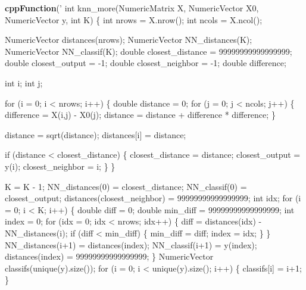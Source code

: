 \documentclass[]{article}
\newenvironment{Shaded}{\begin{snugshade}}{\end{snugshade}}
\newcommand{\KeywordTok}[1]{\textcolor[rgb]{0.13,0.29,0.53}{\textbf{#1}}}
\newcommand{\NormalTok}[1]{#1}
\newcommand{\StringTok}[1]{\textcolor[rgb]{0.31,0.60,0.02}{#1}}
\begin{document}
\begin{Shaded}
\begin{Highlighting}[]
\KeywordTok{cppFunction}\NormalTok{(}\StringTok{'}
\StringTok{int knn_more(NumericMatrix X, NumericVector X0, NumericVector y, int K) \{}
\StringTok{    int nrows = X.nrow();}
\StringTok{    int ncols = X.ncol();}

\StringTok{    NumericVector distances(nrows);}
\StringTok{    NumericVector NN_distances(K);}
\StringTok{    NumericVector NN_classif(K);}
\StringTok{    double closest_distance = 99999999999999999;}
\StringTok{    double closest_output = -1;}
\StringTok{    double closest_neighbor = -1;}
\StringTok{    double difference;}

\StringTok{    int i;}
\StringTok{    int j;}
\StringTok{    }

\StringTok{    for (i = 0; i < nrows; i++) \{}
\StringTok{        }
\StringTok{        double distance = 0;}
\StringTok{        for (j = 0; j < ncols; j++) \{}
\StringTok{            difference = X(i,j) - X0(j);}
\StringTok{            distance = distance + difference * difference;}
\StringTok{        \}}

\StringTok{        distance = sqrt(distance);}
\StringTok{        distances[i] = distance;}

\StringTok{        if (distance < closest_distance) \{}
\StringTok{            closest_distance = distance;}
\StringTok{            closest_output = y(i);}
\StringTok{            closest_neighbor = i;}
\StringTok{        \}}
\StringTok{    \}}

\StringTok{    K = K - 1;}
\StringTok{    NN_distances(0) = closest_distance;}
\StringTok{    NN_classif(0) = closest_output;}
\StringTok{    distances(closest_neighbor) = 99999999999999999;}
\StringTok{    }
\StringTok{    int idx;}
\StringTok{    for (i = 0; i < K; i++) \{}
\StringTok{      double diff = 0;}
\StringTok{      double min_diff = 99999999999999999;}
\StringTok{      int index = 0;}
\StringTok{      for (idx = 0; idx < nrows; idx++) \{}
\StringTok{        diff = distances(idx) - NN_distances(i);}
\StringTok{        if (diff < min_diff) \{}
\StringTok{          min_diff = diff;}
\StringTok{          index = idx;}
\StringTok{        \}}
\StringTok{      \}}
\StringTok{      NN_distances(i+1) = distances(index);}
\StringTok{      NN_classif(i+1) = y(index);}
\StringTok{      distances(index) = 99999999999999999;}
\StringTok{    \}}
\StringTok{    }
\StringTok{    NumericVector classifs(unique(y).size());}
\StringTok{    for (i = 0; i < unique(y).size(); i++) \{}
\StringTok{      classifs[i] = i+1;}
\StringTok{    \}}


\end{Highlighting}
\end{Shaded}
\end{document}
